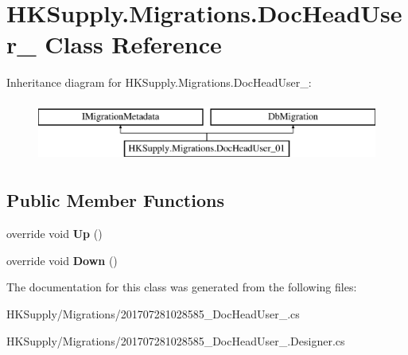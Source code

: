 \hypertarget{class_h_k_supply_1_1_migrations_1_1_doc_head_user__01}{}\section{H\+K\+Supply.\+Migrations.\+Doc\+Head\+User\+\_ Class Reference}
\label{class_h_k_supply_1_1_migrations_1_1_doc_head_user__01}
Inheritance diagram for H\+K\+Supply.\+Migrations.\+Doc\+Head\+User\+\_\+:\begin{figure}[H]
\begin{center}
\leavevmode
\includegraphics[height=2.000000cm]{class_h_k_supply_1_1_migrations_1_1_doc_head_user__01}
\end{center}
\end{figure}
\subsection*{Public Member Functions}
\begin{DoxyCompactItemize}
\item 
\mbox{\label{class_h_k_supply_1_1_migrations_1_1_doc_head_user__01_a4a8bd169b546a2bf504b15fb6ad79aa6}} 
override void {\bfseries Up} ()
\item 
\mbox{\label{class_h_k_supply_1_1_migrations_1_1_doc_head_user__01_ab179c12452d85e53c88df0d1050297cf}} 
override void {\bfseries Down} ()
\end{DoxyCompactItemize}


The documentation for this class was generated from the following files\+:\begin{DoxyCompactItemize}
\item 
H\+K\+Supply/\+Migrations/201707281028585\+\_\+\+Doc\+Head\+User\+\_.\+cs\item 
H\+K\+Supply/\+Migrations/201707281028585\+\_\+\+Doc\+Head\+User\+\_.\+Designer.\+cs\end{DoxyCompactItemize}
